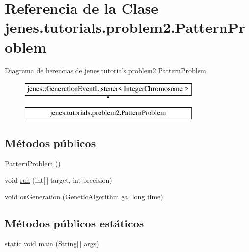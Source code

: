 \hypertarget{classjenes_1_1tutorials_1_1problem2_1_1_pattern_problem}{\section{Referencia de la Clase jenes.\-tutorials.\-problem2.\-Pattern\-Problem}
\label{classjenes_1_1tutorials_1_1problem2_1_1_pattern_problem}
}
Diagrama de herencias de jenes.\-tutorials.\-problem2.\-Pattern\-Problem\begin{figure}[H]
\begin{center}
\leavevmode
\includegraphics[height=2.000000cm]{classjenes_1_1tutorials_1_1problem2_1_1_pattern_problem}
\end{center}
\end{figure}
\subsection*{Métodos públicos}
\begin{DoxyCompactItemize}
\item 
\hyperlink{classjenes_1_1tutorials_1_1problem2_1_1_pattern_problem_a9ee82a524430805d9d04cfbb07d81148}{Pattern\-Problem} ()
\item 
void \hyperlink{classjenes_1_1tutorials_1_1problem2_1_1_pattern_problem_ae9d7568d540e52512e2e6ce589c624bd}{run} (int\mbox{[}$\,$\mbox{]} target, int precision)
\item 
void \hyperlink{classjenes_1_1tutorials_1_1problem2_1_1_pattern_problem_a32a0d783caa7bc42a8bb8b96ce0e4fe2}{on\-Generation} (Genetic\-Algorithm ga, long time)
\end{DoxyCompactItemize}
\subsection*{Métodos públicos estáticos}
\begin{DoxyCompactItemize}
\item 
static void \hyperlink{classjenes_1_1tutorials_1_1problem2_1_1_pattern_problem_a194be818fd81bffd0167012016a7035c}{main} (String\mbox{[}$\,$\mbox{]} args)
\end{DoxyCompactItemize}


